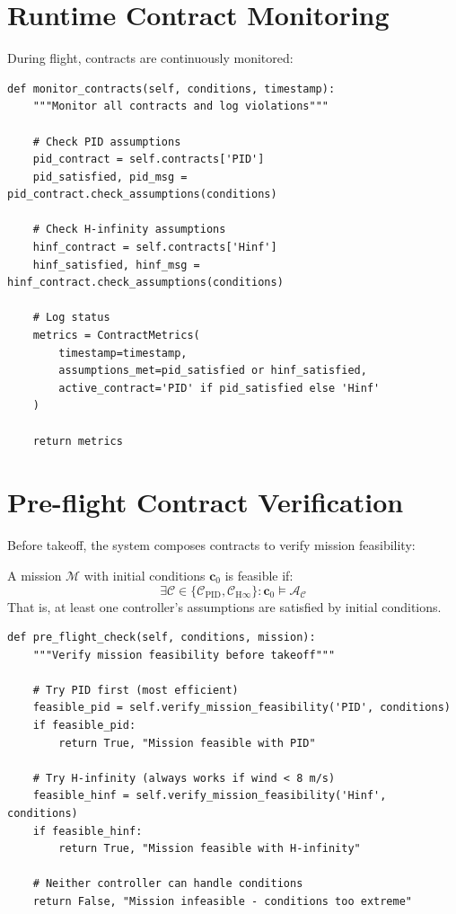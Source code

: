 \section{Runtime Contract Monitoring}

During flight, contracts are continuously monitored:

\begin{lstlisting}[caption={Runtime contract monitoring}]
def monitor_contracts(self, conditions, timestamp):
    """Monitor all contracts and log violations"""

    # Check PID assumptions
    pid_contract = self.contracts['PID']
    pid_satisfied, pid_msg = pid_contract.check_assumptions(conditions)

    # Check H-infinity assumptions
    hinf_contract = self.contracts['Hinf']
    hinf_satisfied, hinf_msg = hinf_contract.check_assumptions(conditions)

    # Log status
    metrics = ContractMetrics(
        timestamp=timestamp,
        assumptions_met=pid_satisfied or hinf_satisfied,
        active_contract='PID' if pid_satisfied else 'Hinf'
    )

    return metrics
\end{lstlisting}

\section{Pre-flight Contract Verification}

Before takeoff, the system composes contracts to verify mission feasibility:

\begin{theorem}
A mission $\mathcal{M}$ with initial conditions $\mathbf{c}_0$ is feasible if:
\begin{equation}
\exists \mathcal{C} \in \{\mathcal{C}_{\text{PID}}, \mathcal{C}_{\text{H}\infty}\}: \mathbf{c}_0 \models \mathcal{A}_{\mathcal{C}}
\end{equation}
That is, at least one controller's assumptions are satisfied by initial conditions.
\end{theorem}

\begin{lstlisting}[caption={Pre-flight contract verification}]
def pre_flight_check(self, conditions, mission):
    """Verify mission feasibility before takeoff"""

    # Try PID first (most efficient)
    feasible_pid = self.verify_mission_feasibility('PID', conditions)
    if feasible_pid:
        return True, "Mission feasible with PID"

    # Try H-infinity (always works if wind < 8 m/s)
    feasible_hinf = self.verify_mission_feasibility('Hinf', conditions)
    if feasible_hinf:
        return True, "Mission feasible with H-infinity"

    # Neither controller can handle conditions
    return False, "Mission infeasible - conditions too extreme"
\end{lstlisting}

